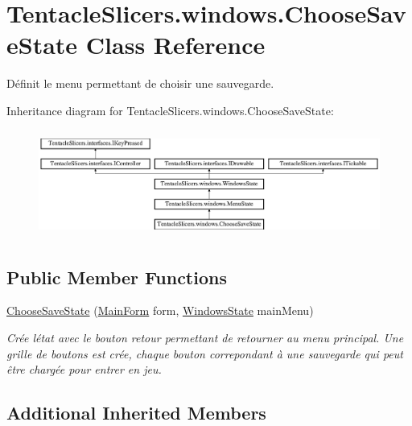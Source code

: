 \hypertarget{class_tentacle_slicers_1_1windows_1_1_choose_save_state}{}\section{Tentacle\+Slicers.\+windows.\+Choose\+Save\+State Class Reference}
\label{class_tentacle_slicers_1_1windows_1_1_choose_save_state}


Définit le menu permettant de choisir une sauvegarde.  


Inheritance diagram for Tentacle\+Slicers.\+windows.\+Choose\+Save\+State\+:\begin{figure}[H]
\begin{center}
\leavevmode
\includegraphics[height=3.548796cm]{class_tentacle_slicers_1_1windows_1_1_choose_save_state}
\end{center}
\end{figure}
\subsection*{Public Member Functions}
\begin{DoxyCompactItemize}
\item 
\hyperlink{class_tentacle_slicers_1_1windows_1_1_choose_save_state_ac55569512099d6f62acdea0dcab46012}{Choose\+Save\+State} (\hyperlink{class_tentacle_slicers_1_1windows_1_1_main_form}{Main\+Form} form, \hyperlink{class_tentacle_slicers_1_1windows_1_1_windows_state}{Windows\+State} main\+Menu)
\begin{DoxyCompactList}\small\item\em Crée l\textquotesingle{}état avec le bouton retour permettant de retourner au menu principal. Une grille de boutons est crée, chaque bouton correpondant à une sauvegarde qui peut être chargée pour entrer en jeu. \end{DoxyCompactList}\end{DoxyCompactItemize}
\subsection*{Additional Inherited Members}


